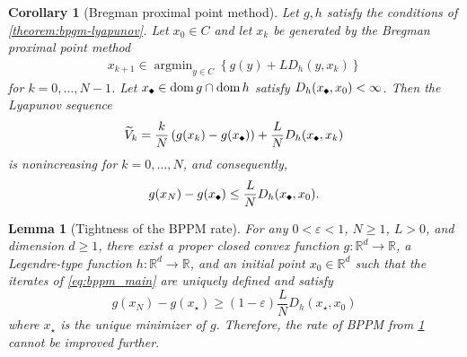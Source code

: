 \documentclass[10pt,a4paper]{amsart}
\newtheorem{corollary}{Corollary}
\newtheorem{lemma}{Lemma}
\DeclareMathOperator*{\argmin}{argmin}
\newcommand{\bregprox}{g}
\newcommand{\compidx}{%
  \mathord{\mathchoice
    {\vcenter{\hbox{\rotatebox{45}{\rule{0.39em}{0.39em}}}}}
    {\vcenter{\hbox{\rotatebox{45}{\rule{0.39em}{0.39em}}}}}
    {\vcenter{\hbox{\rotatebox{45}{\rule{0.29em}{0.29em}}}}}
    {\vcenter{\hbox{\rotatebox{45}{\rule{0.23em}{0.23em}}}}}}%
}
\newcommand{\pr}[1]{\left( #1 \right)}
\newcommand{\reals}{\mathbb{R}}
\begin{document}
\begin{corollary}[Bregman proximal point method]
\label{corollary:bppm-rate}
Let $\bregprox,h$ satisfy the conditions of \cref{theorem:bpgm-lyapunov}.
Let $x_0 \in C$ and let $x_k$ be generated by the Bregman proximal point method
\begin{align}
\tag{BPPM}\label{eq:bppm_main}
    x_{k+1}\in\argmin_{y\in C}
    \left\{
        \bregprox(y)+L D_h(y,x_k)
    \right\}
\end{align}
for $k=0,\dots,N-1$.
Let $x_{\compidx} \in \operatorname{dom}\bregprox\cap\operatorname{dom}h$ satisfy $D_h(x_{\compidx},x_0)<\infty$.
Then the Lyapunov sequence
\[
    \widetilde V_k=\frac{k}{N}\pr{\bregprox(x_k)-\bregprox(x_{\compidx})}+\frac{L}{N}D_h(x_{\compidx},x_k)
\]
is nonincreasing for $k=0,\dots,N$, and consequently,
\[
    \bregprox(x_N)-\bregprox(x_{\compidx})\le \frac{L}{N}D_h(x_{\compidx},x_0) .
\]
\end{corollary}

\begin{lemma}[Tightness of the BPPM rate]
\label{lemma:bppm-tightness}
For any $0<\varepsilon<1$, $N\ge1$, $L>0$, and dimension $d\ge1$, there exist a proper closed convex function $\bregprox:\reals^d\to\reals$, a Legendre-type function $h:\reals^d\to\reals$, and an initial point $x_0\in\reals^d$ such that the iterates of \ref{eq:bppm_main} are uniquely defined and satisfy
\[
    \bregprox(x_N)-\bregprox(x_\star)
    \ge (1-\varepsilon)\frac{L}{N}D_h(x_\star,x_0) 
\]
where $x_\star$ is the unique minimizer of $\bregprox$.
Therefore, the rate of BPPM from \cref{corollary:bppm-rate} 
cannot be improved further.
\end{lemma}
\end{document}
